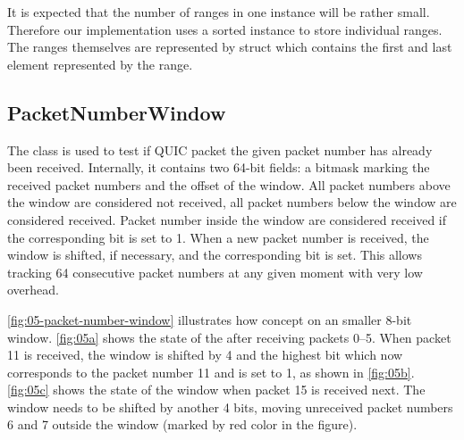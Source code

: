 It is expected that the number of ranges in one \RangeSet{} instance will be rather small. Therefore
our implementation uses a sorted  instance to store individual ranges. The ranges
themselves are represented by  struct which contains the first and last
element represented by the range.

\subsection{PacketNumberWindow}

The \PacketNumberWindow{} class is used to test if QUIC packet the given packet number has already
been received. Internally, it contains two 64-bit  fields: a bitmask marking the
received packet numbers and the offset of the window. All packet numbers above the window are
considered not received, all packet numbers below the window are considered received. Packet number
inside the window are considered received if the corresponding bit is set to 1. When a new packet
number is received, the window is shifted, if necessary, and the corresponding bit is set. This
allows tracking 64 consecutive packet numbers at any given moment with very low overhead.


\autoref{fig:05-packet-number-window} illustrates how concept on an smaller 8-bit window.
\autoref{fig:05a} shows the state of the \PacketNumberWindow{} after receiving packets 0--5. When
packet 11 is received, the window is shifted by 4 and the highest bit which now corresponds to the
packet number 11 and is set to 1, as shown in \autoref{fig:05b}. \autoref{fig:05c} shows the state
of the window when packet 15 is received next. The window needs to be shifted by another 4 bits,
moving unreceived packet numbers 6 and 7 outside the window (marked by red color in the figure).

\newlength{\origframesep}
\setlength{\fboxsep}{0.12em}

